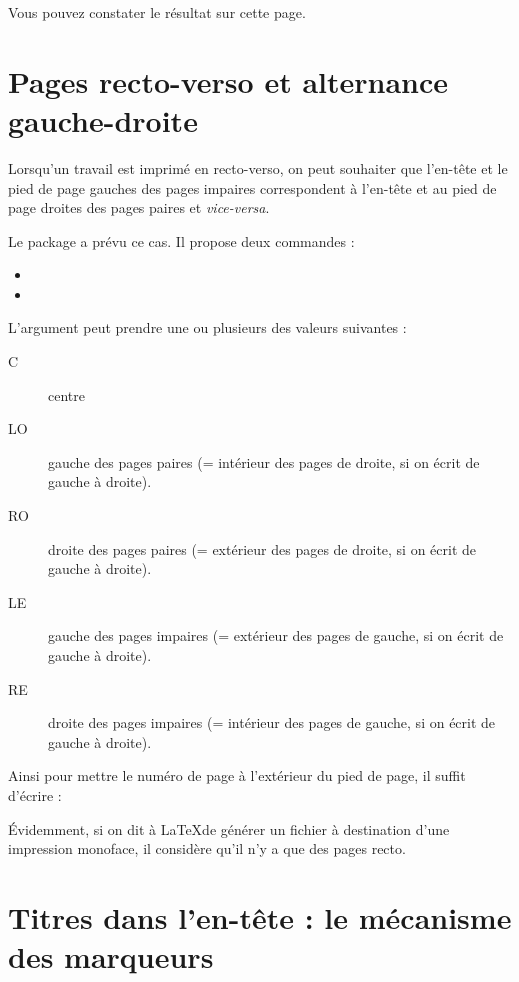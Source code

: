 Vous pouvez constater le résultat sur cette page.\thispagestyle{fancy}\cfoot{{\thepage} / \ref{TotPages}} \renewcommand{\headrulewidth}{0pt}

\section{Pages recto-verso et alternance gauche-droite}

Lorsqu'un travail est imprimé en recto-verso, on peut souhaiter que l'en-tête et le pied de page gauches des pages impaires correspondent à l'en-tête et au pied de page droites des pages paires et \emph{vice-versa}.

Le package  a prévu ce cas. Il propose deux commandes : 
\begin{itemize}
\item {}
\item {}
\end{itemize}

L'argument  peut prendre une ou plusieurs des valeurs suivantes :
\begin{description}
\item[C] centre
\item[LO] gauche des pages paires (= intérieur des pages de droite, si on écrit de gauche à droite).
\item[RO] droite des pages paires (= extérieur des pages de droite, si on écrit de gauche à droite).
\item[LE] gauche des pages impaires (= extérieur des pages  de gauche, si on écrit de gauche à droite).
\item[RE] droite des pages impaires (= intérieur des pages de gauche, si on écrit de gauche à droite).
\end{description}

Ainsi pour mettre le numéro de page à l'extérieur du pied de page, il suffit d'écrire :

\begin{latexcode}
\fancyfoot[LE,RO]{\thepage}
\end{latexcode}

Évidemment, si on dit à \LaTeX de générer un fichier à destination d'une impression monoface, il considère qu'il n'y a que des pages recto.

\section{Titres dans l'en-tête : le mécanisme des marqueurs}

